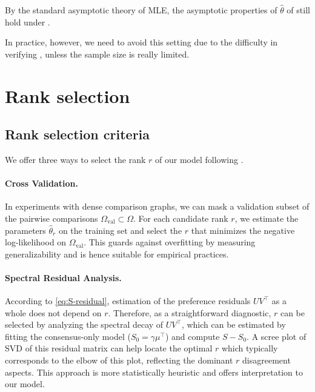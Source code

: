 \documentclass{article}
\begin{document}
\begin{bibunit}[unsrtnat]
By the standard asymptotic theory of MLE, the asymptotic properties of $\hat{\theta}$ of  still hold under .

In practice, however, we need to avoid this setting due to the difficulty in verifying , unless the sample size is really limited.



\clearpage
\section{Rank selection}\label{app:rank-selection}

\subsection{Rank selection criteria}
\label{app:subsec:rank-selection}
We offer three ways to select the rank $r$ of our model following .
\paragraph{Cross Validation.}
In experiments with dense comparison graphs, we can mask a validation subset of the pairwise comparisons $\Omega_{\text{val}} \subset \Omega$. For each candidate rank $r$, we estimate the parameters $\hat{\theta}_r$ on the training set and select the $r$ that minimizes the negative log-likelihood on $\Omega_{\text{val}}$. This guards against overfitting by measuring generalizability and is hence suitable for empirical practices.

\paragraph{Spectral Residual Analysis.}
According to \eqref{eq:S-residual}, estimation of the preference residuals $UV^\top$ as a whole does not depend on $r$. Therefore, as a straightforward diagnostic, $r$ can be selected by analyzing the spectral decay of $UV^\top$, which can be estimated by fitting the consensus-only model ($S_0 = \gamma \mu^\top$) and compute $S-S_0$. A scree plot of SVD of this residual matrix can help locate the optimal $r$ which typically corresponds to the elbow of this plot, reflecting the dominant $r$ disagreement aspects. This approach is more statistically heuristic and offers interpretation to our model.


\end{bibunit}
\end{document}
